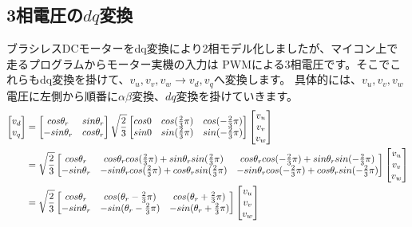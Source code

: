 \subsection{3相電圧の$dq$変換}
ブラシレスDCモーターをdq変換により2相モデル化しましたが、マイコン上で走るプログラムからモーター実機の入力は
PWMによる3相電圧です。そこでこれらもdq変換を掛けて、$v_{u},v_{v},v_{w} → v_{d},v_{q}$へ変換します。
具体的には、$v_{u},v_{v},v_{w}$電圧に左側から順番に$\alpha\beta$変換、$dq$変換を掛けていきます。
{\large
\begin{align}
    \begin{bmatrix}
        v_{d} \\
        v_{q}
    \end{bmatrix}
    &=
    \begin{bmatrix}
        cos\theta_{r} & sin\theta_{r} \\
        -sin\theta_{r} & cos\theta_{r}
    \end{bmatrix}
    \sqrt{\frac{2}{3}}
    \begin{bmatrix}
        cos0 & cos(\frac{2}{3} \pi) & cos(-\frac{2}{3} \pi) \\
        sin0 & sin(\frac{2}{3} \pi) & sin(-\frac{2}{3} \pi)
    \end{bmatrix}
    \begin{bmatrix}
        v_{u} \\
        v_{v} \\
        v_{w}
    \end{bmatrix}
    \notag \\
    &=
    \sqrt{\frac{2}{3}}
    \begin{bmatrix}
        cos\theta_{r} & cos\theta_{r} cos(\frac{2}{3}\pi) + sin\theta_{r} sin(\frac{2}{3}\pi) & cos\theta_{r} cos(-\frac{2}{3}\pi) + sin\theta_{r} sin(-\frac{2}{3}\pi) \\
        -sin\theta_{r} & -sin\theta_{r} cos(\frac{2}{3}\pi) + cos\theta_{r} sin(\frac{2}{3}\pi) & -sin\theta_{r} cos(-\frac{2}{3}\pi) + cos\theta_{r} sin(-\frac{2}{3}\pi)
    \end{bmatrix}
    \begin{bmatrix}
        v_{u} \\
        v_{v} \\
        v_{w}
    \end{bmatrix}
    \notag \\
    &=
    \sqrt{\frac{2}{3}}
    \begin{bmatrix}
        cos\theta_{r} & cos(\theta_{r} - \frac{2}{3}\pi) & cos(\theta_{r} + \frac{2}{3}\pi) \\
        -sin\theta_{r} & -sin(\theta_{r} - \frac{2}{3}\pi) & -sin(\theta_{r} + \frac{2}{3}\pi)
    \end{bmatrix}
    \begin{bmatrix}
        v_{u} \\
        v_{v} \\
        v_{w}
    \end{bmatrix}
    \label{uvw-dq}
\end{align}
}

